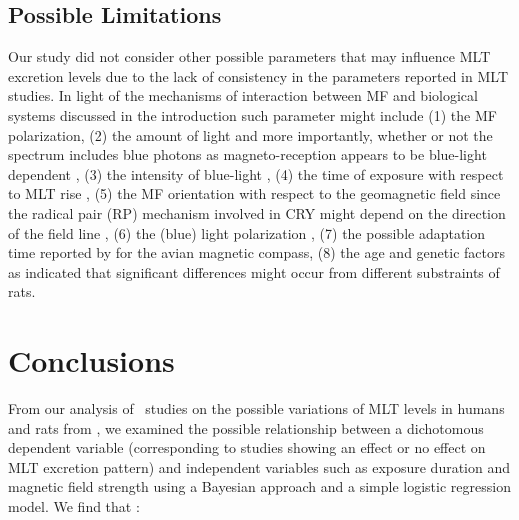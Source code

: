 \documentclass[letter,twoside]{article}
\begin{document}
\subsection*{Possible Limitations}
\label{section:limitations}

Our study did not consider other possible parameters that may influence MLT excretion levels due to the lack of consistency in the parameters reported in MLT studies.
In light of the mechanisms of interaction between MF and biological systems discussed in the introduction %
such parameter might include
 (1) the MF polarization, 
 (2) the amount of light and more importantly, whether or not the spectrum includes blue photons  as magneto-reception appears to be blue-light dependent \citep[e.g.][]{Chasmore1999,Ritz2000,Gegear2008,Chaves2011,Michael2017,Vanderstraeten2018}, 
 (3) the intensity of blue-light \citep[as magneto-reception might be inversely proportional to the photon flux, e.g.][]{Vanderstraeten2018},
 (4) the  time of exposure with respect to MLT rise \citep[as suggested by][]{Wood1998,Vanderstraeten2012},
  (5) the  MF orientation with respect to the geomagnetic field since the radical pair (RP) mechanism involved in CRY
might depend on the direction of the field line \citep{Wiltschko2014,Zhang2015},
 (6)  the (blue) light polarization \citep[as discussed in][]{Stoneham2012,Hore2016},
 (7) the possible adaptation time reported by \citet{Wiltschko2014} for the avian magnetic compass,
 (8) the age \citep{Vanderstraeten2012} and genetic factors as \citet{Fedrowitz2004} indicated that significant differences might occur from different substraints of rats.
 

 
\section*{Conclusions}
\label{section:conclusions}

From our analysis of \Ntot\ studies on the possible variations of MLT levels in humans and rats from \citet{Jahandideh2010,Touitou2012,Halgamuge2013},
we examined the possible relationship between a dichotomous dependent variable (corresponding to studies showing an effect or no effect on MLT excretion pattern) and independent variables such as exposure duration and magnetic field strength using a  Bayesian approach and a simple logistic regression model. We find that :
\end{document}
